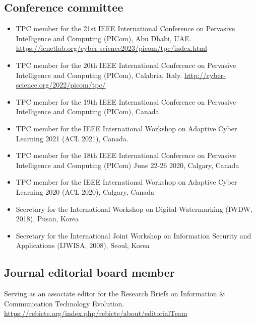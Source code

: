 \documentclass{article}
\begin{document}
\subsection*{Conference committee}\vspace{-0.5em}
\begin{itemize}
\setlength\itemsep{-0.4em}
    \item TPC member for the 21st IEEE International Conference on Pervasive Intelligence and Computing (PICom), Abu Dhabi, UAE. \url{https://icnetlab.org/cyber-science2023/picom/tpc/index.html}
    \item TPC member for the 20th IEEE International Conference on Pervasive Intelligence and Computing (PICom), Calabria, Italy. \url{http://cyber-science.org/2022/picom/tpc/} 
    \item TPC member for the 19th IEEE International Conference on Pervasive Intelligence and Computing (PICom), Canada.
    \item TPC member for the IEEE International Workshop on Adaptive Cyber Learning 2021 (ACL 2021), Canada.
    \item TPC member for the 18th IEEE International Conference on Pervasive Intelligence and Computing (PICom) June 22-26 2020, Calgary, Canada
    \item TPC member for the IEEE International Workshop on Adaptive Cyber Learning 2020 (ACL 2020), Calgary, Canada
    \item Secretary for the International Workshop on Digital Watermarking (IWDW, 2018), Pusan, Korea
    \item Secretary for the International Joint Workshop on Information Security and Applications (IJWISA, 2008), Seoul, Korea
\end{itemize}


\subsection*{Journal editorial board member}\vspace{-0.5em}
\begin{adjustwidth}{1cm}{}
Serving as an associate editor for the Research Briefs on Information \& Communication Technology Evolution. \url{https://rebicte.org/index.php/rebicte/about/editorialTeam}
\end{adjustwidth}

\vspace{-1em}
\end{document}
